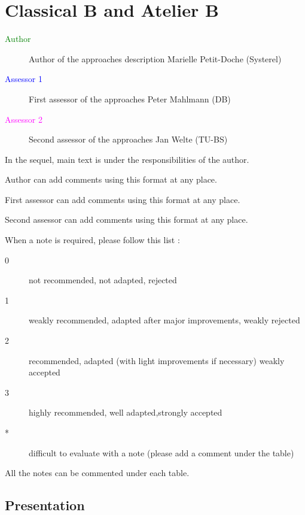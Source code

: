 \chapter{Classical B and Atelier B}
\label{chap:classicalB}


\begin{description}
\item[\textcolor{green}{Author}] Author of the approaches description  Marielle Petit-Doche (Systerel)
\item[\textcolor{blue}{Assessor 1}] First assessor of the approaches Peter Mahlmann (DB)
\item[\textcolor{magenta}{Assessor 2}] Second assessor of the approaches Jan Welte (TU-BS)
\end{description}

In the sequel, main text is under the responsibilities of the author.

\begin{author_comment}
Author can add comments using this format at any place.
\end{author_comment}

\begin{assessor1}
First assessor can add comments using this format at any place.
\end{assessor1}

\begin{assessor2}
Second assessor can add comments using this format at any place.
\end{assessor2}

When a note is required, please follow this list :
\begin{description}
\item[0] not recommended, not adapted, rejected
\item[1] weakly recommended, adapted after major improvements, weakly rejected
\item[2] recommended, adapted (with light improvements if necessary)  weakly accepted
\item[3] highly recommended, well adapted,strongly accepted
\item[*] difficult to evaluate with a note (please add a comment under the table)
\end{description}

All the notes can be commented under each table.

\section{Presentation}

